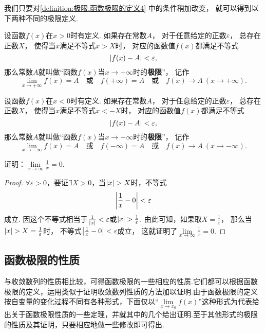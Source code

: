 我们只要对\cref{definition:极限.函数极限的定义4} 中的条件稍加改变，%
就可以得到以下两种不同的极限定义.
\begin{definition}\label{definition:极限.函数极限的定义5}
设函数\(f(x)\)在\(x > 0\)时有定义.
如果存在常数\(A\)，%
对于任意给定的正数\(\varepsilon\)，%
总存在正数\(X\)，%
使得当\(x\)满足不等式\(x > X\)时，%
对应的函数值\(f(x)\)都满足不等式\[
\abs{f(x) - A} < \varepsilon,
\]那么常数\(A\)就叫做“函数\(f(x)\)当\(x \to +\infty\)时的\textbf{极限}”，%
记作\[
\lim\limits_{x \to +\infty} f(x) = A
\quad\text{或}\quad
f(+\infty) = A
\quad\text{或}\quad
f(x) \to A\ (x \to +\infty).
\]
\end{definition}

\begin{definition}\label{definition:极限.函数极限的定义6}
设函数\(f(x)\)在\(x < 0\)时有定义.
如果存在常数\(A\)，%
对于任意给定的正数\(\varepsilon\)，%
总存在正数\(X\)，%
使得当\(x\)满足不等式\(x < -X\)时，%
对应的函数值\(f(x)\)都满足不等式\[
\abs{f(x) - A} < \varepsilon,
\]那么常数\(A\)就叫做“函数\(f(x)\)当\(x \to -\infty\)时的\textbf{极限}”，%
记作\[
\lim\limits_{x \to -\infty} f(x) = A
\quad\text{或}\quad
f(-\infty) = A
\quad\text{或}\quad
f(x) \to A\ (x \to -\infty).
\]
\end{definition}

\begin{example}
\def\l{\lim\limits_{x\to\infty}}
证明：\(\l \frac{1}{x} = 0\).
\begin{proof}
\(\forall\varepsilon>0\)，要证\(\exists X > 0\)，当\(\abs{x}>X\)时，不等式\[
\abs{\frac{1}{x}-0}<\varepsilon
\]成立.
因这个不等式相当于\(\frac{1}{\abs{x}}<\varepsilon\)或\(\abs{x}>\frac{1}{\varepsilon}\).
由此可知，如果取\(X=\frac{1}{\varepsilon}\)，%
那么当\(\abs{x}>X=\frac{1}{\varepsilon}\)时，%
不等式\(\abs{\frac{1}{x}-0}<\varepsilon\)成立，%
这就证明了\(\l \frac{1}{x} = 0\).
\end{proof}
\end{example}

\subsection{函数极限的性质}
与收敛数列的性质相比较，可得函数极限的一些相应的性质.它们都可以根据函数极限的定义，运用类似于证明收敛数列性质的方法加以证明.由于函数极限的定义按自变量的变化过程不同有各种形式，下面仅以“\(\lim\limits_{x \to x_0}f(x)\)”这种形式为代表给出关于函数极限性质的一些定理，并就其中的几个给出证明.至于其他形式的极限的性质及其证明，只要相应地做一些修改即可得出.

